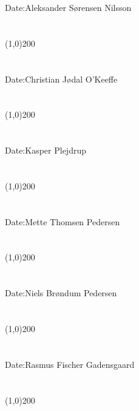Date:\indent\indent Aleksander Sørensen Nilsson\\\\\\
\indent\line(1,0){200}\\\\\\
\indent Date:\indent\indent Christian Jødal O'Keeffe\\\\\\
\indent\line(1,0){200}\\\\\\
\indent Date:\indent\indent  Kasper Plejdrup\\\\\\
\indent\line(1,0){200}\\\\\\
\indent Date:\indent\indent  Mette Thomsen Pedersen\\\\\\
\indent\line(1,0){200}\\\\\\
\indent Date:\indent\indent  Niels Brøndum Pedersen\\\\\\
\indent\line(1,0){200}\\\\\\
\indent Date:\indent\indent  Rasmus Fischer Gadensgaard\\\\\\
\indent\line(1,0){200}\\\\\\
